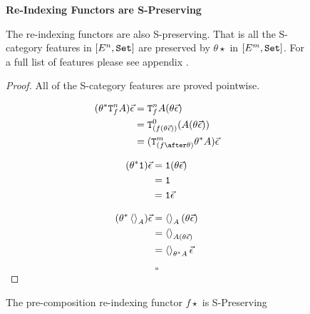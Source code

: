 \documentclass{Report}
\begin{document}
\begin{figure}
    
    \begin{framed}
        \centering
        \textbf{Re-Indexing Functors are S-Preserving}
                
        \begin{theorem}
            The re-indexing functors are also S-preserving. That is all the S-category features in $[E^n, \texttt{Set}]$ are preserved by $\theta\star$ in $[E^m, \texttt{Set}]$. For a full list of features please see appendix \needsRef{}.
        \end{theorem}
        
        
        \begin{proof}
            All of the S-category features are proved pointwise.
        
            \begin{align*}
                (\theta\star\Tn{f}{A})\ev & = \Tn{f}{A}(\theta\ev) \\
                & = \Tz{(f(\theta\ev))}{(A(\theta\ev))}\\
                & = (\Tm{(f\after\theta)}{\theta\star A})\ev\\
            \end{align*}
        
            
        \begin{align*}
            (\theta^* \texttt{1})\vec{\epsilon} & = \texttt{1}(\theta\vec{\epsilon})\\
            & = \texttt{1} \\
            & = \texttt{1} \vec{\epsilon}\\
        \end{align*}
        
        \begin{align*}
            (\theta^*\left\langle\right\rangle_{A})\vec{\epsilon} & = \left\langle\right\rangle_{A}(\theta\vec{\epsilon})\\
            & = \left\langle\right\rangle_{A(\theta\vec{\epsilon})}\\
            & = \left\langle\right\rangle_{\theta^* A}\vec{\epsilon}
        \end{align*}
        
            $$\square$$
        \end{proof}
    \end{framed}
    \caption{The pre-composition re-indexing functor $f\star$ is S-Preserving}
    \label{PrecompositionSClosure}
\end{figure}
\end{document}
